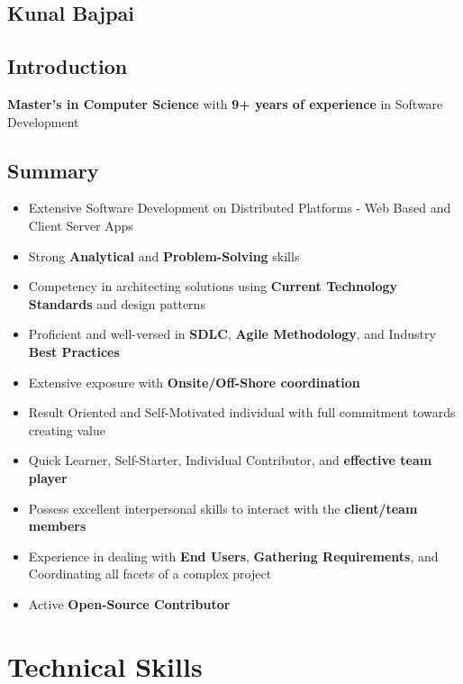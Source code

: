 \documentclass[letterpaper,10pt]{article}
\begin{document}
    \begin{center}
    \section{Kunal Bajpai}
    \end{center}

    \subsection{Introduction}
    \textbf{Master's in Computer Science} with \textbf{9+ years of experience} in Software Development

    \subsection{Summary}
    \begin{itemize}
        \item Extensive Software Development on Distributed Platforms - Web Based and Client Server Apps
        \item Strong \textbf{Analytical} and \textbf{Problem-Solving} skills
        \item Competency in architecting solutions using \textbf{Current Technology Standards} and design patterns
        \item Proficient and well-versed in \textbf{SDLC}, \textbf{Agile Methodology}, and Industry \textbf{Best Practices}
        \item Extensive exposure with \textbf{Onsite/Off-Shore coordination}
        \item Result Oriented and Self-Motivated individual with full commitment towards creating value
        \item Quick Learner, Self-Starter, Individual Contributor, and \textbf{effective team player}
        \item Possess excellent interpersonal skills to interact with the \textbf{client/team members}
        \item Experience in dealing with \textbf{End Users}, \textbf{Gathering Requirements}, and Coordinating all facets of a complex project
        \item Active \textbf{Open-Source Contributor}
    \end{itemize}

    \section{Technical Skills}
\end{document}
